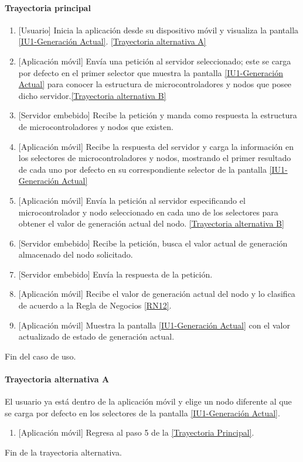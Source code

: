 \paragraph{Trayectoria principal}
    \label{SUB-U-CU1.1:TP}
	\begin{enumerate}
	    \item {[Usuario]} Inicia la aplicación desde su dispositivo móvil y visualiza la pantalla \hyperref[fig:monitoreoReal]{[IU1-Generación Actual]}. \hyperref[SUB-U-CU1.1:TA]{[Trayectoria alternativa A]}
	    \item {[Aplicación móvil]} Envía una petición al servidor seleccionado; este se carga por defecto en el primer selector que muestra la pantalla \hyperref[fig:monitoreoReal]{[IU1-Generación Actual]} para conocer la estructura de microcontroladores y nodos que posee dicho servidor.\hyperref[SUB-U-CU1.1:TB]{[Trayectoria alternativa B]}
	    \item {[Servidor embebido]} Recibe la petición y manda como respuesta la estructura de microcontroladores y nodos que existen.
	    \item {[Aplicación móvil]} Recibe la respuesta del servidor y carga la información en los selectores de microcontroladores y nodos, mostrando el primer resultado de cada uno por defecto en su correspondiente selector de la pantalla \hyperref[fig:monitoreoReal]{[IU1-Generación Actual]} 
	    \item {[Aplicación móvil]} Envía la petición al servidor especificando el microcontrolador y nodo seleccionado en cada uno de los selectores para obtener el valor de generación actual del nodo. \hyperref[SUB-U-CU1.1:TB]{[Trayectoria alternativa B]} 
	    \item {[Servidor embebido]} Recibe la petición, busca el valor actual de generación almacenado del nodo solicitado. 
	    \item {[Servidor embebido]} Envía la respuesta de la petición.
	    \item {[Aplicación móvil]} Recibe el valor de generación actual del nodo y lo clasifica de acuerdo a la Regla de Negocios \ref{RN12}. 
	    \item {[Aplicación móvil]} Muestra la pantalla \hyperref[fig:monitoreoReal]{[IU1-Generación Actual]} con el valor actualizado de estado de generación actual.
	\end{enumerate}
	Fin del caso de uso.

\paragraph{Trayectoria alternativa A} \label{SUB-U-CU1.1:TA}
	El usuario ya está dentro de la aplicación móvil y elige un nodo diferente al que se carga por defecto en los selectores de la pantalla \hyperref[fig:monitoreoReal]{[IU1-Generación Actual]}.
	\begin{enumerate}[label=A\arabic*.]
		\item {[Aplicación móvil]} Regresa al paso 5 de la \hyperref[SUB-U-CU1.1:TP]{[Trayectoria Principal]}.
	\end{enumerate}
	Fin de la trayectoria alternativa.

